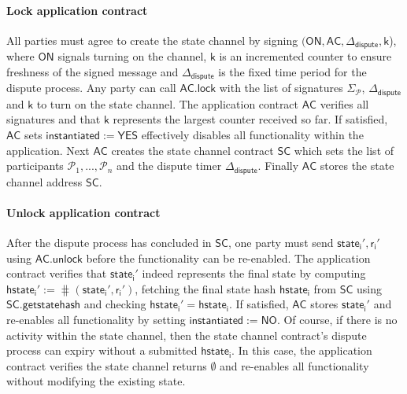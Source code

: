 \documentclass{llncs}
\newcommand{\instantiated}{\mathsf{instantiated}}
\newcommand{\instantiatedno}{\mathsf{NO}}
\newcommand{\instantiatedyes}{\mathsf{YES}}
\newcommand{\chanon}{\mathsf{ON}}
\newcommand{\hstatei}{\mathsf{hstate}_{\monotoniccounter}}
\newcommand{\monotoniccounter}{\mathsf{i}}
\newcommand{\stateinfoi}{\mathsf{state}_{\mathsf{i}}}
\newcommand{\participant}{\mathcal{P}}
\newcommand{\rani}{\mathsf{r}_{\mathsf{i}}}
\newcommand{\statechannel}{\mathsf{SC}}
\newcommand{\statechannelgetcommitment}{\mathsf{SC}.\mathsf{getstatehash}}
\newcommand{\appcontract}{\mathsf{AC}}
\newcommand{\applock}{\mathsf{AC.lock}}
\newcommand{\appunlock}{\mathsf{AC.unlock}}
\newcommand{\timerdispute}{\mathsf{\Delta}_{\mathsf{dispute}}}
\begin{document}
 
\paragraph{Lock application contract} All parties must agree to create the state channel by signing $(\chanon, \appcontract, \timerdispute, \mathsf{k}$), where $\chanon$ signals turning on the channel, $\mathsf{k}$ is an incremented counter to ensure freshness of the signed message and $\timerdispute$ is the fixed time period for the dispute process. 
Any party can call $\applock$ with the list of signatures $\Sigma_{\participant}$, $\timerdispute$ and $\mathsf{k}$ to turn on the state channel. 
The application contract $\appcontract$ verifies all signatures and that $\mathsf{k}$ represents the largest counter received so far.
If satisfied, $\appcontract$ sets  $\instantiated := \instantiatedyes$ effectively disables all functionality within the application.
Next $\appcontract$ creates the state channel contract $\statechannel$ which sets the list of participants $\participant_{1},...,\participant_{n}$ and the dispute timer $\timerdispute$. 
Finally $\appcontract$ stores the state channel address $\statechannel$. 
 

\paragraph{Unlock application contract}

After the dispute process has concluded in $\statechannel$, one party must send  $\stateinfoi',\rani'$ using $\appunlock$ before the functionality can be re-enabled.
The application contract verifies that $\stateinfoi'$  indeed represents the final state by computing $\hstatei' := \hash(\stateinfoi', \rani')$, fetching the final state hash $\hstatei$ from $\statechannel$ using $\statechannelgetcommitment$ and checking  $\hstatei' = \hstatei$. 
If satisfied, $\appcontract$ stores $\stateinfoi'$ and re-enables all functionality by setting $\instantiated :=  \instantiatedno$. 
Of course, if there is no activity within the state channel, then the state channel contract's dispute process can expiry without a submitted $\hstatei$.
In this case, the application contract verifies the state channel returns $\emptyset$ and re-enables all functionality without modifying the existing state. 


\end{document}
